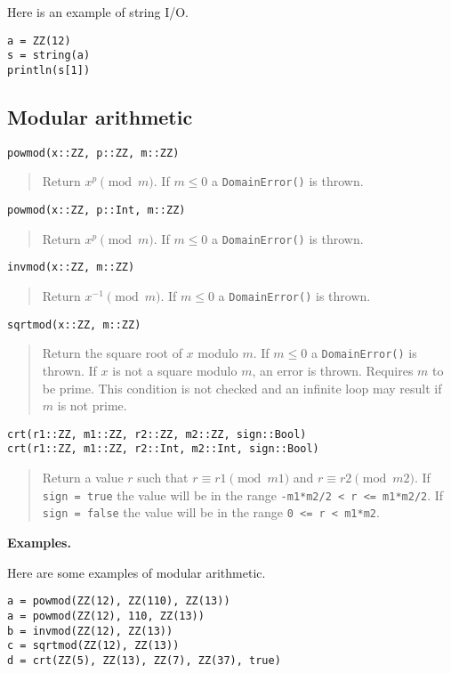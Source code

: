 \documentclass[a4paper,10pt]{article}
\newcommand{\code}{\lstinline}
\newcommand{\desc}[1]{\vspace{-3mm}\begin{quote}#1\end{quote}}
\begin{document}
{{{Here is an example of string I/O.

\begin{lstlisting}
a = ZZ(12)
s = string(a)
println(s[1])
\end{lstlisting}

\subsection{Modular arithmetic}

\begin{lstlisting}
powmod(x::ZZ, p::ZZ, m::ZZ)
\end{lstlisting}

\desc{Return $x^p \pmod{m}$. If $m \leq 0$ a \code{DomainError()} is thrown.}

\begin{lstlisting}
powmod(x::ZZ, p::Int, m::ZZ)
\end{lstlisting}

\desc{Return $x^p \pmod{m}$. If $m \leq 0$ a \code{DomainError()} is thrown.}

\begin{lstlisting}
invmod(x::ZZ, m::ZZ)
\end{lstlisting}

\desc{Return $x^{-1} \pmod{m}$. If $m \leq 0$ a \code{DomainError()} is thrown.}

\begin{lstlisting}
sqrtmod(x::ZZ, m::ZZ)
\end{lstlisting}

\desc{Return the square root of $x$ modulo $m$. If $m \leq 0$ a \code{DomainError()}
is thrown. If $x$ is not a square modulo $m$, an error is thrown. Requires $m$ to
be prime. This condition is not checked and an infinite loop may result if $m$ is
not prime.}

\begin{lstlisting}
crt(r1::ZZ, m1::ZZ, r2::ZZ, m2::ZZ, sign::Bool)
crt(r1::ZZ, m1::ZZ, r2::Int, m2::Int, sign::Bool)
\end{lstlisting}

\desc{Return a value $r$ such that $r \equiv r1 \pmod {m1}$ and $r \equiv r2 \pmod{m2}$.
If \code{sign = true} the value will be in the range \code{-m1*m2/2 < r <= m1*m2/2}. If
\code{sign = false} the value will be in the range \code{0 <= r < m1*m2}.}

\textbf{Examples.}

Here are some examples of modular arithmetic.

\begin{lstlisting}
a = powmod(ZZ(12), ZZ(110), ZZ(13))
a = powmod(ZZ(12), 110, ZZ(13))
b = invmod(ZZ(12), ZZ(13))
c = sqrtmod(ZZ(12), ZZ(13))
d = crt(ZZ(5), ZZ(13), ZZ(7), ZZ(37), true)
\end{lstlisting}

}}}
\end{document}
